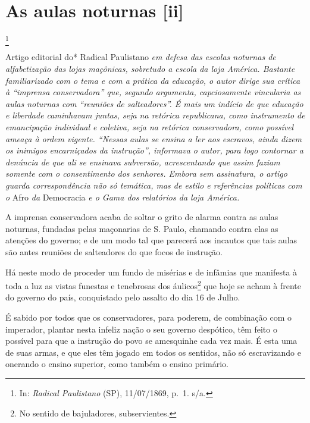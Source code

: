 \chapter{As aulas noturnas {[}ii{]}}\footnote{In: \emph{Radical Paulistano}
  (SP), 11/07/1869, p.~1. s/a.}

\begin{didascalia}
Artigo editorial do* Radical Paulistano \emph{em defesa das escolas
noturnas de alfabetização das lojas maçônicas, sobretudo a escola da
loja América. Bastante familiarizado com o tema e com a prática da
educação, o autor dirige sua crítica à ``imprensa conservadora'' que,
segundo argumenta, capciosamente vincularia as aulas noturnas com
``reuniões de salteadores''. É mais um indício de que educação e liberdade
caminhavam juntas, seja na retórica republicana, como instrumento de
emancipação individual e coletiva, seja na retórica conservadora, como
possível ameaça à ordem vigente. ``Nessas aulas se ensina a ler aos
escravos, ainda dizem os inimigos encarniçados da instrução'', informava
o autor, para logo contornar a denúncia de que ali se ensinava
subversão, acrescentando que assim faziam somente com o consentimento
dos senhores. Embora sem assinatura, o artigo guarda correspondência não
só temática, mas de estilo e referências políticas com o} Afro \emph{da}
Democracia \emph{e o Gama dos relatórios da loja América.}
\end{didascalia}

\asterisc{}

A imprensa conservadora acaba de soltar o grito de alarma contra as
aulas noturnas, fundadas pelas maçonarias de S. Paulo, chamando contra
elas as atenções do governo; e de um modo tal que parecerá aos incautos
que tais aulas são antes reuniões de salteadores do que focos de
instrução.

Há neste modo de proceder um fundo de misérias e de infâmias que
manifesta à toda a luz as vistas funestas e tenebrosas dos
áulicos\footnote{No sentido de bajuladores, subservientes.} que hoje
se acham à frente do governo do país, conquistado pelo assalto do dia 16
de Julho.

É sabido por todos que os conservadores, para poderem, de combinação com
o imperador, plantar nesta infeliz nação o seu governo despótico, têm
feito o possível para que a instrução do povo se amesquinhe cada vez
mais. É esta uma de suas armas, e que eles têm jogado em todos os
sentidos, não só escravizando e onerando o ensino superior, como também
o ensino primário.

